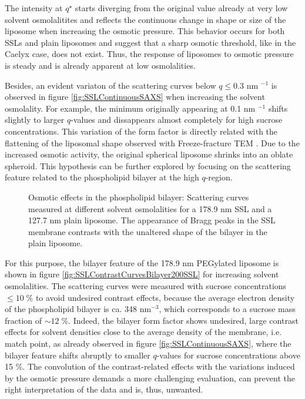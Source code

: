 The intensity at $q^{\star}$ starts diverging from the original value already at very low solvent osmolalitites and reflects the continuous change in shape or size of the liposome when increasing the osmotic pressure. This behavior occurs for both SSLs and plain liposomes and suggest that a sharp osmotic threshold, like in the Caelyx case, does not exist. Thus, the response of liposomes to osmotic pressure is steady and is already apparent at low osmolalities.

Besides, an evident variaton of the scattering curves below $q\leq0.3$ nm $^{-1}$ is observed in figure \ref{fig:SSLContinuousSAXS} when increasing the solvent osmolality. For example, the minimum originally appearing at 0.1 nm $^{-1}$ shifts slightly to larger $q$-values and dissappears almost completely for high sucrose concentrations. This variation of the form factor is directly related with the flattening of the liposomal shape observed with Freeze-fracture TEM \cite{varga_osmotic_2014}. Due to the increased osmotic activity, the original spherical liposome shrinks into an oblate spheroid. This hypothesis can be further explored by focusing on the scattering feature related to the phospholipid bilayer at the high $q$-region.

\begin{figure}
	\centering
		\subfloat[PEG 178.9 nm]{\resizebox{0.44\linewidth}{!}{}\label{fig:SSLContrastCurvesBilayer200SSL}}
		\subfloat[Plain 127.7 nm]{\resizebox{0.44\linewidth}{!}{}\label{fig:SSLContrastCurvesBilayer100Plain}}
		\caption{Osmotic effects in the phospholipid bilayer: Scattering curves measured at different solvent osmolalities for a 178.9 nm SSL and a 127.7 nm plain liposome. The appearance of Bragg peaks in the SSL membrane contrasts with the unaltered shape of the bilayer in the plain liposome.}
\end{figure}

For this purpose, the bilayer feature of the 178.9 nm PEGylated liposome is shown in figure \ref{fig:SSLContrastCurvesBilayer200SSL} for increasing solvent osmolalities. The scattering curves were measured with sucrose concentrations $\leq10\;\%$ to avoid undesired contrast effects, because the average electron density of the phospholipid bilayer is ca. 348 nm$^{-3}$, which corresponds to a sucrose mass fraction of $\sim 12 \; \%$. Indeed, the bilayer form factor shows undesired, large contrast effects for solvent densities close to the average density of the membrane, i.e. match point, as already observed in figure \ref{fig:SSLContinuousSAXS}, where the bilayer feature shifts abruptly to smaller $q$-values for sucrose concentrations above 15 $\%$. The convolution of the contrast-related effects with the variations induced by the osmotic pressure demands a more challenging evaluation, can prevent the right interpretation of the data and is, thus, unwanted.

